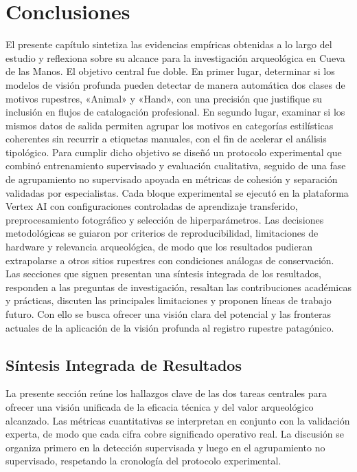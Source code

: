 \chapter{Conclusiones}\label{ch:conclusiones}

El presente capítulo sintetiza las evidencias empíricas obtenidas a lo largo del estudio y reflexiona sobre su alcance para la investigación arqueológica en Cueva de las Manos.
El objetivo central fue doble.
En primer lugar, determinar si los modelos de visión profunda pueden detectar de manera automática dos clases de motivos rupestres, «Animal» y «Hand», con una precisión que justifique su inclusión en flujos de catalogación profesional.
En segundo lugar, examinar si los mismos datos de salida permiten agrupar los motivos en categorías estilísticas coherentes sin recurrir a etiquetas manuales, con el fin de acelerar el análisis tipológico.
Para cumplir dicho objetivo se diseñó un protocolo experimental que combinó entrenamiento supervisado y evaluación cualitativa, seguido de una fase de agrupamiento no supervisado apoyada en métricas de cohesión y separación validadas por especialistas.
Cada bloque experimental se ejecutó en la plataforma Vertex AI con configuraciones controladas de aprendizaje transferido, preprocesamiento fotográfico y selección de hiperparámetros.
Las decisiones metodológicas se guiaron por criterios de reproducibilidad, limitaciones de hardware y relevancia arqueológica, de modo que los resultados pudieran extrapolarse a otros sitios rupestres con condiciones análogas de conservación.
Las secciones que siguen presentan una síntesis integrada de los resultados, responden a las preguntas de investigación, resaltan las contribuciones académicas y prácticas, discuten las principales limitaciones y proponen líneas de trabajo futuro.
Con ello se busca ofrecer una visión clara del potencial y las fronteras actuales de la aplicación de la visión profunda al registro rupestre patagónico.

\section{Síntesis Integrada de Resultados}

La presente sección reúne los hallazgos clave de las dos tareas centrales para ofrecer una visión unificada de la eficacia técnica y del valor arqueológico alcanzado.
Las métricas cuantitativas se interpretan en conjunto con la validación experta, de modo que cada cifra cobre significado operativo real.
La discusión se organiza primero en la detección supervisada y luego en el agrupamiento no supervisado, respetando la cronología del protocolo experimental.

